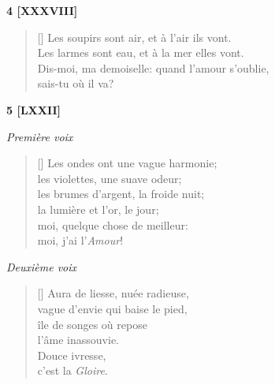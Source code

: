 \documentclass[a4paper,12pt]{book}
\begin{document}
\begin{center}
  \textbf{4 [XXXVIII]}
\end{center}

\settowidth{\versewidth}{Les larmes sont eau, et à la mer elles vont.}

\begin{verse}[\versewidth]
  Les soupirs sont air, et à l'air ils vont. \\
  Les larmes sont eau, et à la mer elles vont. \\
  Dis-moi, ma demoiselle: quand l'amour s'oublie, \\
  sais-tu où il va?
\end{verse}

\bigskip

\begin{center}
  \textbf{5 [LXXII]}
\end{center}


\begin{center} \emph{Première voix} \end{center}

\begin{verse}[\versewidth]
  Les ondes ont une vague harmonie; \\
  les violettes, une suave odeur; \\
  les brumes d'argent, la froide nuit; \\
  la lumière et l'or, le jour; \\
  moi, quelque chose de meilleur: \\
  moi, j'ai l'\emph{Amour}!
\end{verse}

\smallskip

\begin{center} \emph{Deuxième voix} \end{center}

\begin{verse}[\versewidth]
  Aura de liesse, nuée radieuse, \\
  vague d'envie qui baise le pied, \\
  île de songes où repose \\
  l'âme inassouvie. \\
  Douce ivresse, \\
  c'est la \emph{Gloire}.
\end{verse}
\end{document}
